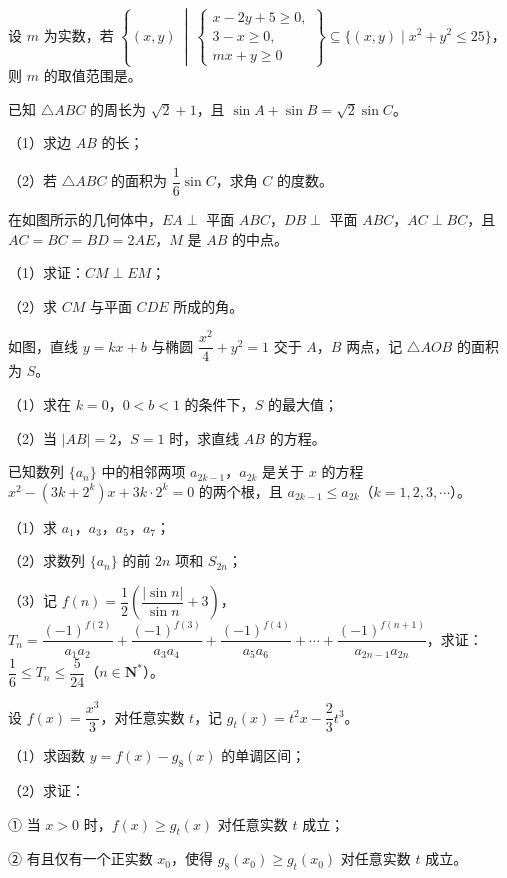 \begin{question}
设 $m$ 为实数，若 $\left\{(x,y)\ \middle|\ \begin{cases}x-2y+5\geqslant0,\\ 3-x\geqslant0,\\ mx+y\geqslant0\end{cases}\right\}\subseteq\{(x,y)\mid x^2+y^2\leqslant25\}$，则 $m$ 的取值范围是\gkblank{}。

\end{question}

\begin{question}
已知 $\triangle ABC$ 的周长为 $\sqrt2+1$，且 $\sin A+\sin B=\sqrt2\sin C$。

（1）求边 $AB$ 的长；

（2）若 $\triangle ABC$ 的面积为 $\dfrac16\sin C$，求角 $C$ 的度数。

\Needspace{0.4\textheight}
\end{question}
\begin{question}
在如图所示的几何体中，$EA\perp$ 平面 $ABC$，$DB\perp$ 平面 $ABC$，$AC\perp BC$，且 $AC=BC=BD=2AE$，$M$ 是 $AB$ 的中点。

（1）求证：$CM\perp EM$；

（2）求 $CM$ 与平面 $CDE$ 所成的角。
\nopagebreak[4]
\begin{center}\end{center}
\nopagebreak[4]
\Needspace{0.4\textheight}
\end{question}
\begin{question}
如图，直线 $y=kx+b$ 与椭圆 $\dfrac{x^2}{4}+y^2=1$ 交于 $A$，$B$ 两点，记 $\triangle AOB$ 的面积为 $S$。

（1）求在 $k=0$，$0<b<1$ 的条件下，$S$ 的最大值；

（2）当 $|AB|=2$，$S=1$ 时，求直线 $AB$ 的方程。
\nopagebreak[4]
\begin{center}\end{center}
\nopagebreak[4]
\end{question}
\begin{question}
已知数列 $\{a_n\}$ 中的相邻两项 $a_{2k-1}$，$a_{2k}$ 是关于 $x$ 的方程 $x^2-(3k+2^k)x+3k\cdot2^k=0$ 的两个根，且 $a_{2k-1}\leqslant a_{2k}$（$k=1,2,3,\cdots$）。

（1）求 $a_1$，$a_3$，$a_5$，$a_7$；

（2）求数列 $\{a_n\}$ 的前 $2n$ 项和 $S_{2n}$；

（3）记 $f(n)=\dfrac12\left(\dfrac{|\sin n|}{\sin n}+3\right)$，$T_n=\dfrac{(-1)^{f(2)}}{a_1a_2}+\dfrac{(-1)^{f(3)}}{a_3a_4}+\dfrac{(-1)^{f(4)}}{a_5a_6}+\cdots+\dfrac{(-1)^{f(n+1)}}{a_{2n-1}a_{2n}}$，求证：$\dfrac16\leqslant T_n\leqslant\dfrac5{24}$（$n\in\mathbf N^*$）。

\end{question}
\begin{question}
设 $f(x)=\dfrac{x^3}{3}$，对任意实数 $t$，记 $g_t(x)=t^2x-\dfrac23t^3$。

（1）求函数 $y=f(x)-g_8(x)$ 的单调区间；

（2）求证：

① 当 $x>0$ 时，$f(x)\geqslant g_t(x)$ 对任意实数 $t$ 成立；

② 有且仅有一个正实数 $x_0$，使得 $g_8(x_0)\geqslant g_t(x_0)$ 对任意实数 $t$ 成立。

\end{question}